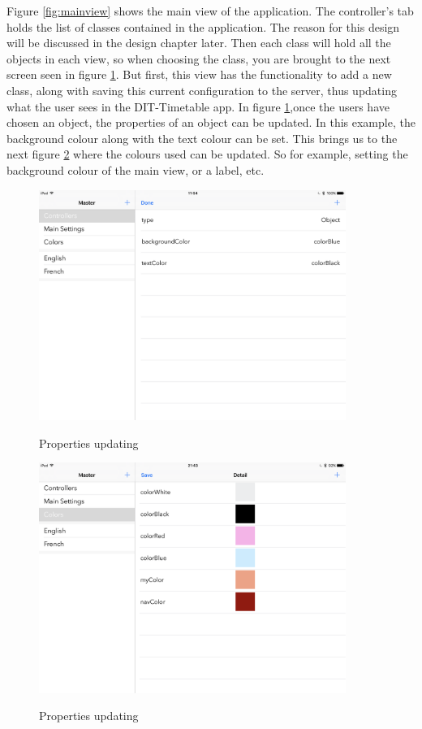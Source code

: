 Figure \ref{fig:mainview} shows the main view of the application. The controller's tab holds the list of classes contained in the application. The reason for this design will be discussed in the design chapter later. Then each class will hold all the objects in each view, so when choosing the class, you are brought to the next screen seen in figure \ref{fig:update-config}. But first, this view has the functionality to add a new class, along with saving this current configuration to the server, thus updating what the user sees in the DIT-Timetable app. In figure \ref{fig:update-config},once the users have chosen an object, the properties of an object can be updated. In this example, the background colour along with the text colour can be set. This brings us to the next figure \ref{fig:config-color} where the colours used can be updated. So for example, setting the background colour of the main view, or a label, etc.

\begin{figure}[h]
    \caption{Properties updating}
    \centering
    \includegraphics[width=100mm]{images/ipad-images/update}
    \label{fig:update-config}
\end{figure}


\begin{figure}[!h]
    \caption{Properties updating}
    \centering
    \includegraphics[width=100mm]{images/ipad-images/color}
    \label{fig:config-color}
\end{figure}